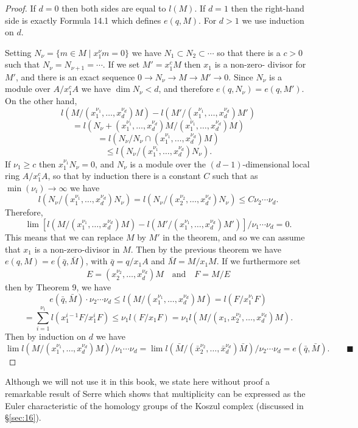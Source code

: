 \begin{proof}
If $d = 0$ then both sides are equal to $l(M)$. If $d = 1$ then the right-hand
side is exactly Formula 14.1 which defines $e(q, M)$. For $d > 1$ we use
induction on $d$.

Setting $N_\nu = \{m \in M \mid x_1^\nu m = 0\}$ we have $N_1 \subset N_2 \subset \cdots$ so that there is a
$c > 0$ such that $N_\nu = N_{\nu+1} = \cdots$. If we set $M' = x_1^cM$ then $x_1$ is a non-zero-
divisor for $M'$, and there is an exact sequence $0 \to N_\nu \to M \to M' \to 0$.
Since $N_\nu$ is a module over $A/x_1^cA$ we have $\dim N_\nu < d$, and therefore
$e(q, N_\nu) = e(q, M')$. On the other hand,
\[
  l(M/(x_1^{\nu_1}, \ldots, x_d^{\nu_d})M) - l(M'/(x_1^{\nu_1}, \ldots, x_d^{\nu_d})M')
\]
\[
  = l(N_\nu + (x_1^{\nu_1}, \ldots, x_d^{\nu_d})M/(x_1^{\nu_1}, \ldots, x_d^{\nu_d})M)
\]
\[
  = l(N_\nu/N_\nu \cap (x_1^{\nu_1}, \ldots, x_d^{\nu_d})M)
\]
\[
  \le l(N_\nu/(x_1^{\nu_1}, \ldots, x_d^{\nu_d})N_\nu).
\]
If $\nu_1 \ge c$ then $x_1^{\nu_1}N_\nu = 0$, and $N_\nu$ is a module over the $(d - 1)$-dimensional
local ring $A/x_1^cA$, so that by induction there is a constant $C$ such that as
$\min(\nu_i) \to \infty$ we have
\[
  l(N_\nu/(x_1^{\nu_1}, \ldots, x_d^{\nu_d})N_\nu) = l(N_\nu/(x_2^{\nu_2}, \ldots, x_d^{\nu_d})N_\nu) \le C\nu_2 \cdots \nu_d.
\]
Therefore,
\[
  \lim [l(M/(x_1^{\nu_1}, \ldots, x_d^{\nu_d})M) - l(M'/(x_1^{\nu_1}, \ldots, x_d^{\nu_d})M')]/\nu_1 \cdots \nu_d = 0.
\]
This means that we can replace $M$ by $M'$ in the theorem, and so we can
assume that $x_1$ is a non-zero-divisor in $M$. Then by the previous theorem we
have $e(q, M) = e(\bar{q}, \bar{M})$, with $\bar{q} = q/x_1A$ and $\bar{M} = M/x_1M$. If we furthermore set
\[
  E = (x_2^{\nu_2}, \ldots, x_d^{\nu_d})M \quad \text{and} \quad F = M/E
\]
then by Theorem 9, we have
\[
  e(\bar{q}, \bar{M}) \cdot \nu_2 \cdots \nu_d \le l(M/(x_1^{\nu_1}, \ldots, x_d^{\nu_d})M) = l(F/x_1^{\nu_1}F)
\]
\[
  = \sum_{i=1}^{\nu_1} l(x_1^{i-1}F/x_1^iF) \le \nu_1l(F/x_1F) = \nu_1l(M/(x_1, x_2^{\nu_2}, \ldots, x_d^{\nu_d})M).
\]
Then by induction on $d$ we have
\[
  \lim l(M/(x_1^{\nu_1}, \ldots, x_d^{\nu_d})M)/\nu_1 \cdots \nu_d = \lim l(\bar{M}/(\bar{x}_2^{\nu_2}, \ldots, \bar{x}_d^{\nu_d})\bar{M})/\nu_2 \cdots \nu_d
  = e(\bar{q}, \bar{M}). \qquad\blacksquare
\]
\end{proof}

Although we will not use it in this book, we state here without proof a
remarkable result of Serre which shows that multiplicity can be expressed
as the Euler characteristic of the homology groups of the Koszul complex
(discussed in \S\ref{sec:16}).

